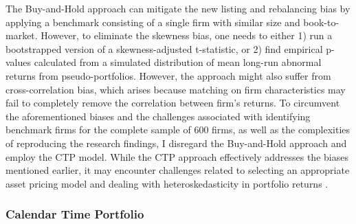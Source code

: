 The Buy-and-Hold approach can mitigate the new listing and rebalancing bias by applying a benchmark consisting of a single firm with similar size and book-to-market. However, to eliminate the skewness bias, one needs to either 1) run a bootstrapped version of a skewness-adjusted t-statistic, or 2) find empirical p-values calculated from a simulated distribution of mean long-run abnormal returns from pseudo-portfolios. However, the approach might also suffer from cross-correlation bias, which arises because matching on firm characteristics may fail to completely remove the correlation between firm's returns. To circumvent the aforementioned biases and the challenges associated with identifying benchmark firms for the complete sample of 600 firms, as well as the complexities of reproducing the research findings, I disregard the Buy-and-Hold approach and employ the CTP model. While the CTP approach effectively addresses the biases mentioned earlier, it may encounter challenges related to selecting an appropriate asset pricing model and dealing with heteroskedasticity in portfolio returns \cite{lyon1999improved}.

\subsubsection{Calendar Time Portfolio}

